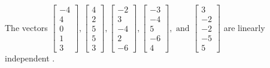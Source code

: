 \begin{exercise}
\begin{exerciseStatement}
  \end{exerciseStatement}
  \begin{exerciseAnswer}
   The vectors \(\left[\begin{array}{r}
-4 \\
4 \\
0 \\
1 \\
3
\end{array}\right] , \left[\begin{array}{r}
4 \\
2 \\
5 \\
5 \\
3
\end{array}\right] , \left[\begin{array}{r}
-2 \\
3 \\
-4 \\
2 \\
-6
\end{array}\right] , \left[\begin{array}{r}
-3 \\
-4 \\
5 \\
-6 \\
4
\end{array}\right] , \text{ and } \left[\begin{array}{r}
3 \\
-2 \\
-2 \\
-5 \\
5
\end{array}\right]\) are 
  	 linearly independent  .
  


  \end{exerciseAnswer}
\end{exercise}
